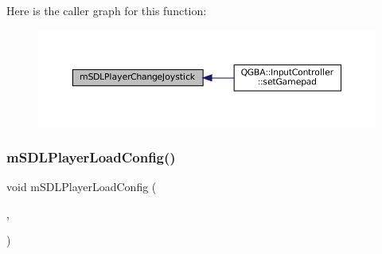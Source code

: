 Here is the caller graph for this function\+:
\nopagebreak
\begin{figure}[H]
\begin{center}
\leavevmode
\includegraphics[width=350pt]{sdl-events_8h_a3a4fc78a8a0a3803658a89cce1b2f300_icgraph}
\end{center}
\end{figure}
\mbox{\label{sdl-events_8h_afe63fe20f988ad01630127c84e300223}} 
\subsubsection{\texorpdfstring{m\+S\+D\+L\+Player\+Load\+Config()}{mSDLPlayerLoadConfig()}}
{\footnotesize\ttfamily void m\+S\+D\+L\+Player\+Load\+Config (\begin{DoxyParamCaption}\item[{struct \mbox{\hyperlink{sdl-events_8h_structm_s_d_l_player}{m\+S\+D\+L\+Player}} $\ast$}]{,  }\item[{const struct Configuration $\ast$}]{ }\end{DoxyParamCaption})}


